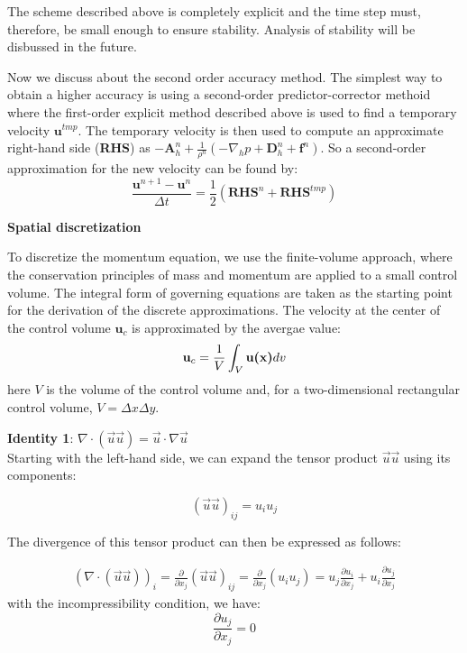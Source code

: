\documentclass[11pt]{article} %
\begin{document}
The scheme described above is completely explicit and the time step must, therefore, be small enough to ensure stability. Analysis of stability will be disbussed in the future.\par
Now we discuss about the second order accuracy method. The simplest way to obtain a higher accuracy is using a second-order predictor-corrector methoid where the first-order explicit method described above is used to find a temporary velocity $\textbf{u}^{tmp}$. The temporary velocity is then used to compute an approximate right-hand side (\textbf{RHS}) as $- \textbf{A}_{h}^{n}+ \frac{1}{\rho^{n}}(-\nabla_{h}p + \textbf{D}_{h}^{n}+ \textbf{f}^{n})$. So a second-order approximation for the new velocity can be found by:
\begin{equation}
\frac{\textbf{u}^{n+1}-\textbf{u}^{n}}{\Delta t}=\frac{1}{2}(\textbf{RHS}^{n}+\textbf{RHS}^{tmp})
\end{equation}\par
\vspace{3mm}
\textbf{Spatial discretization}\par
To discretize the momentum equation, we use the finite-volume approach, where the conservation principles of mass and momentum are applied to a small control volume. The integral form of governing equations are taken as the starting point for the derivation of the discrete approximations. The velocity at the center of the control volume $\textbf{u}_{c}$ is approximated by the avergae value:
\begin{equation}
\textbf{u}_{c} = \frac{1}{V} \int_{V} \textbf{u(\textbf{x})}dv
\end{equation}
here $V$ is the volume of the control volume and, for a two-dimensional rectangular control volume, $V=\Delta x \Delta y$. 

\textbf{Identity 1}: $ \nabla \cdot (\vec{u}\vec{u}) = \vec{u} \cdot \nabla \vec{u}$\\
Starting with the left-hand side, we can expand the tensor product $\vec{u}\vec{u}$ using its components:

$$ (\vec{u}\vec{u})_{ij} = u_i u_j $$

The divergence of this tensor product can then be expressed as follows:

$$ \begin{aligned} (\nabla \cdot (\vec{u}\vec{u}))_{i} = \frac{\partial}{\partial x_j}(\vec{u}\vec{u})_{ij} = \frac{\partial}{\partial x_j}(u_i u_j) = u_j\frac{\partial u_i}{\partial x_j} + u_i\frac{\partial u_j}{\partial x_j} \end{aligned} $$
with the incompressibility condition, we have:
$$
\frac{\partial u_j}{\partial x_j} =0
$$
\end{document}
